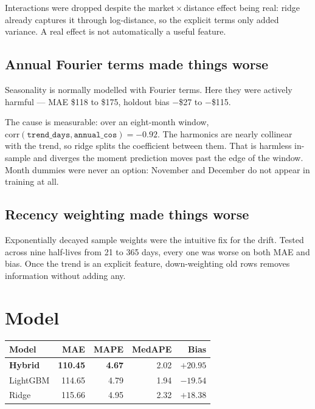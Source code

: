 \documentclass[11pt,a4paper]{article}
\newcommand{\key}[1]{\textbf{\color{spotter}#1}}
\begin{document}
Interactions were dropped despite the market\,$\times$\,distance effect being real:
ridge already captures it through log-distance, so the explicit terms only added
variance. A real effect is not automatically a useful feature.

\subsection{Annual Fourier terms made things worse}

Seasonality is normally modelled with Fourier terms. Here they were actively
harmful --- MAE \$118 to \$175, holdout bias $-$\$27 to $-$\$115.

The cause is measurable: over an eight-month window,
$\mathrm{corr}(\texttt{trend\_days}, \texttt{annual\_cos}) = -0.92$. The harmonics
are nearly collinear with the trend, so ridge splits the coefficient between them.
That is harmless in-sample and diverges the moment prediction moves past the edge
of the window. Month dummies were never an option: November and December do not
appear in training at all.

\subsection{Recency weighting made things worse}

Exponentially decayed sample weights were the intuitive fix for the drift. Tested
across nine half-lives from 21 to 365 days, every one was worse on both MAE and
bias. Once the trend is an explicit feature, down-weighting old rows removes
information without adding any.

\section{Model}

\begin{center}
\small
\begin{tabular}{@{}lrrrr@{}}
\toprule
\textbf{Model} & \textbf{MAE} & \textbf{MAPE} & \textbf{MedAPE} & \textbf{Bias}\\
\midrule
\key{Hybrid} & \key{110.45} & \key{4.67} & 2.02 & $+20.95$\\
LightGBM & 114.65 & 4.79 & 1.94 & $-19.54$\\
Ridge & 115.66 & 4.95 & 2.32 & $+18.38$\\
\bottomrule
\end{tabular}
\end{center}
\end{document}
